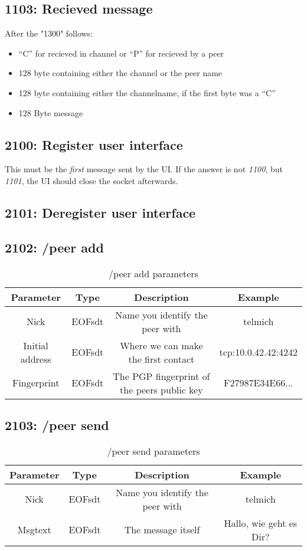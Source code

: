 \documentclass[12pt,a4paper]{book}
\begin{document}
\subsection{1103: Recieved message}
After the "1300" follows:
\begin{itemize}
\item "`C"' for recieved in channel or "`P"' for recieved by a peer
\item 128 byte containing either the channel or the peer name
\item 128 byte containing either the channelname, if the first byte was a "`C"'
\item 128 Byte message
\end{itemize}
\subsection{2100: Register user interface}
This must be the \emph{first} message sent by the UI. If the answer is not
\emph{1100}, but \emph{1101}, the UI should close the socket afterwards.
\subsection{2101: Deregister user interface}
\subsection{2102: /peer add}
%
\begin{longtable}{|c|c|c|c|}
\caption{/peer add parameters}\\
\hline
\textbf{Parameter} & \textbf{Type} & \textbf{Description} & \textbf{Example}\\
\hline
Nick & EOFsdt & Name you identify the peer with & telmich\\
\hline
Initial address & EOFsdt & Where we can make the first contact & tcp:10.0.42.42:4242\\
\hline
Fingerprint & EOFsdt & The PGP fingerprint of the peers public key & F27987E34E66...\\
\hline
\end{longtable}
\subsection{2103: /peer send}
%
\begin{longtable}{|c|c|c|c|}
\caption{/peer send parameters}\\
\hline
\textbf{Parameter} & \textbf{Type} & \textbf{Description} & \textbf{Example}\\
\hline
Nick & EOFsdt & Name you identify the peer with & telmich\\
\hline
Msgtext & EOFsdt & The message itself & Hallo, wie geht es Dir?\\
\hline
\end{longtable}
\end{document}
